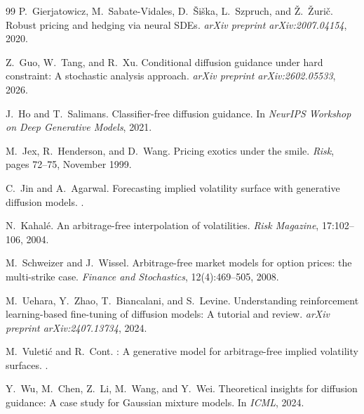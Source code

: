 \documentclass{article}
\newcommand{\1}{\mathbf{1}}
\begin{document}
\begin{thebibliography}{99}
P.~Gierjatowicz, M.~Sabate-Vidales, D.~\v{S}i\v{s}ka, L.~Szpruch, and \v{Z}.~\v{Z}uri\v{c}.
\newblock Robust pricing and hedging via neural {SDE}s.
\newblock \emph{arXiv preprint arXiv:2007.04154}, 2020.

Z.~Guo, W.~Tang, and R.~Xu.
\newblock Conditional diffusion guidance under hard constraint: A stochastic analysis approach.
\newblock \emph{arXiv preprint arXiv:2602.05533}, 2026.

J.~Ho and T.~Salimans.
\newblock Classifier-free diffusion guidance.
\newblock In \emph{NeurIPS Workshop on Deep Generative Models}, 2021.

M.~Jex, R.~Henderson, and D.~Wang.
\newblock Pricing exotics under the smile.
\newblock \emph{Risk}, pages 72--75, November 1999.

C.~Jin and A.~Agarwal.
\newblock Forecasting implied volatility surface with generative diffusion models.
.

N.~Kahal\'e.
\newblock An arbitrage-free interpolation of volatilities.
\newblock \emph{Risk Magazine}, 17:102--106, 2004.

M.~Schweizer and J.~Wissel.
\newblock Arbitrage-free market models for option prices: the multi-strike case.
\newblock \emph{Finance and Stochastics}, 12(4):469--505, 2008.

M.~Uehara, Y.~Zhao, T.~Biancalani, and S.~Levine.
\newblock Understanding reinforcement learning-based fine-tuning of diffusion models: A tutorial and review.
\newblock \emph{arXiv preprint arXiv:2407.13734}, 2024.

M.~Vuleti\'c and R.~Cont.
: A generative model for arbitrage-free implied volatility surfaces.
.

Y.~Wu, M.~Chen, Z.~Li, M.~Wang, and Y.~Wei.
\newblock Theoretical insights for diffusion guidance: A case study for {G}aussian mixture models.
\newblock In \emph{ICML}, 2024.

\end{thebibliography}
\end{document}
